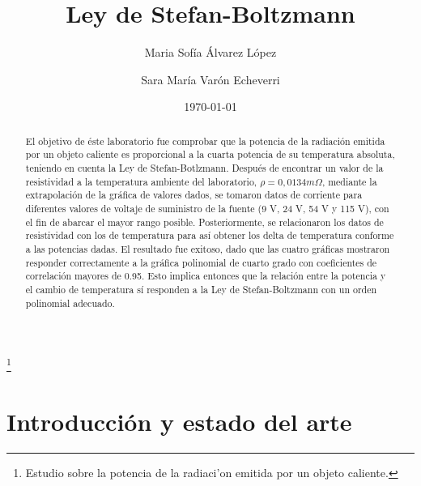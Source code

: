 \documentclass[%
 reprint,
 amsmath,amssymb,
 aps,
]{revtex4-1}
\begin{document}
\title{Ley de Stefan-Boltzmann}%
\thanks{Estudio sobre la potencia de la radiaci'on emitida por un objeto caliente.}%

\author{Maria Sofía Álvarez López}%
%

\author{Sara María Varón Echeverri}
%

\date{\today}%

\begin{abstract}
El objetivo de éste laboratorio fue comprobar que la potencia de la radiación emitida por un objeto caliente es proporcional a la cuarta potencia de su temperatura absoluta, teniendo en cuenta la Ley de Stefan-Botlzmann. Después de encontrar un valor de la resistividad a la temperatura ambiente del laboratorio, $\rho = 0,0134 m\Omega$, mediante la extrapolación de la gráfica de valores dados, se tomaron datos de corriente para diferentes valores de voltaje de suministro de la fuente (9 V, 24 V, 54 V y 115 V), con el fin de abarcar el mayor rango posible. Posteriormente, se relacionaron los datos de resistividad con los de temperatura para así obtener los delta de temperatura conforme a las potencias dadas. El resultado fue exitoso, dado que las cuatro gráficas mostraron responder correctamente a la gráfica polinomial de cuarto grado con coeficientes de correlación mayores de 0.95. Esto implica entonces que la relación entre la potencia y el cambio de temperatura sí responden a la Ley de Stefan-Boltzmann con un orden polinomial adecuado.
 \end{abstract}

\maketitle


\section{\label{sec:level1} Introducción y estado del arte}
\end{document}
